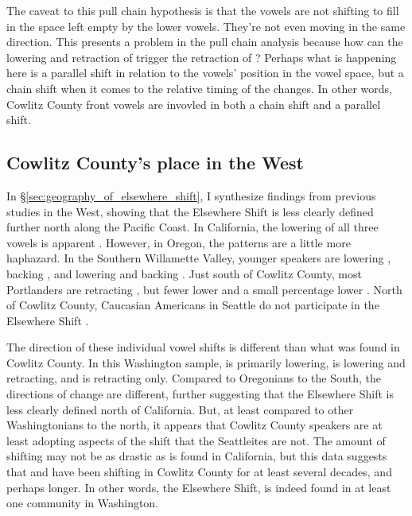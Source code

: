 The caveat to this pull chain hypothesis is that the vowels are not shifting to fill in the space left empty by the lower vowels. They're not even moving in the same direction. This presents a problem in the pull chain analysis because how can the lowering and retraction of \bet trigger the retraction of \bit? Perhaps what is happening here is a parallel shift in relation to the vowels' position in the vowel space, but a chain shift when it comes to the relative timing of the changes. In other words, Cowlitz County front vowels are invovled in both a chain shift and a parallel shift.

\subsection{Cowlitz County's place in the West}
\label{sec:cowlitz_place_in_west_preobstruent}

In \S\ref{sec:geography_of_elsewhere_shift}, I synthesize findings from previous studies in the West, showing that the Elsewhere Shift is less clearly defined further north along the Pacific Coast. In California, the lowering of all three vowels is apparent \citep{janoff_2018, hall_lew_etal_2015, cardoso_etal_2016_pads, kennedy_grama_2012, holland_2014_diss}. However, in Oregon, the patterns are a little more haphazard. In the Southern Willamette Valley, younger speakers are lowering \bit, backing \bet, and lowering and backing \bat \citep{nelson_2011}. Just south of Cowlitz County, most Portlanders are retracting \bat \citep{conn_2000_diss, becker_etal_2013}, but fewer lower \bet and a small percentage lower \bit \citep{becker_etal_2016_pads}. North of Cowlitz County, Caucasian Americans in Seattle do not participate in the Elsewhere Shift \citep{wassink_2015, riebold_2015_diss}.

The direction of these individual vowel shifts is different than what was found in Cowlitz County. In this Washington sample, \bat is primarily lowering, \bet is lowering and retracting, and \bit is retracting only. Compared to Oregonians to the South, the directions of change are different, further suggesting that the Elsewhere Shift is less clearly defined north of California. But, at least compared to other Washingtonians to the north, it appears that Cowlitz County speakers are at least adopting aspects of the shift that the Seattleites are not. The amount of shifting may not be as drastic as is found in California, but this data suggests that \bat and \bet have been shifting in Cowlitz County for at least several decades, and perhaps longer. In other words, the Elsewhere Shift, is indeed found in at least one community in Washington.


